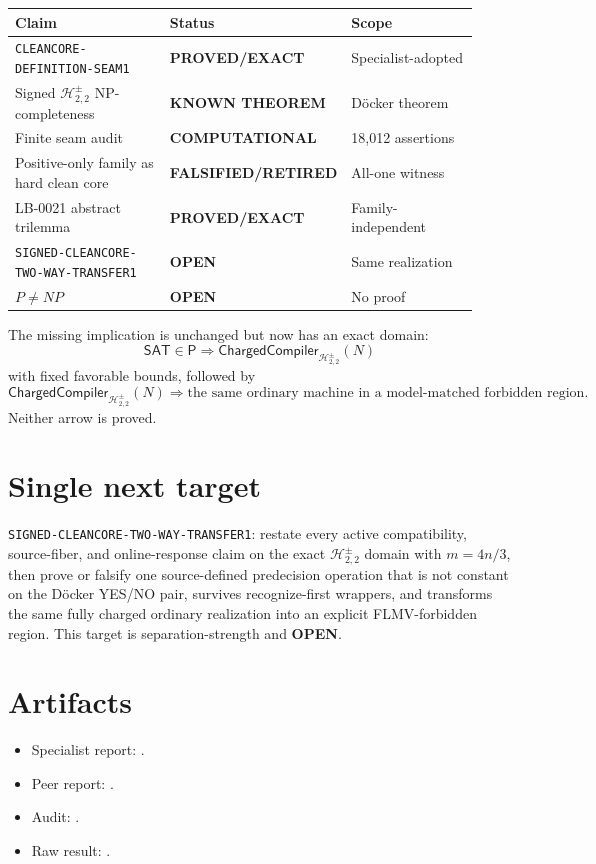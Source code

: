 \documentclass[11pt]{article}
\newcommand{\SAT}{\mathsf{SAT}}
\newcommand{\Hsigned}{\mathcal H^{\pm}_{2,2}}
\newcommand{\EXACT}{\textbf{PROVED/EXACT}}
\newcommand{\KNOWN}{\textbf{KNOWN THEOREM}}
\newcommand{\COMP}{\textbf{COMPUTATIONAL}}
\newcommand{\OPEN}{\textbf{OPEN}}
\newcommand{\RETIRED}{\textbf{FALSIFIED/RETIRED}}
\begin{document}
\begin{center}\scriptsize
\begin{tabular}{@{}p{0.39\linewidth}p{0.22\linewidth}p{0.31\linewidth}@{}}
\toprule
Claim & Status & Scope\\
\midrule
\texttt{CLEANCORE-DEFINITION-SEAM1} & \EXACT & Specialist-adopted\\
Signed $\Hsigned$ NP-completeness & \KNOWN & D\"ocker theorem\\
Finite seam audit & \COMP & 18,012 assertions\\
Positive-only family as hard clean core & \RETIRED & All-one witness\\
LB-0021 abstract trilemma & \EXACT & Family-independent\\
\texttt{SIGNED-CLEANCORE-TWO-WAY-TRANSFER1} & \OPEN & Same realization\\
$P\ne NP$ & \OPEN & No proof\\
\bottomrule
\end{tabular}
\end{center}

The missing implication is unchanged but now has an exact domain:
\[
 \SAT\in\mathsf P
 \Longrightarrow
 \mathsf{ChargedCompiler}_{\Hsigned}(N)
\]
with fixed favorable bounds, followed by
\[
 \mathsf{ChargedCompiler}_{\Hsigned}(N)
 \Longrightarrow
 \text{the same ordinary machine in a model-matched forbidden region}.
\]
Neither arrow is proved.

\section{Single next target}

\texttt{SIGNED-CLEANCORE-TWO-WAY-TRANSFER1}: restate every active
compatibility, source-fiber, and online-response claim on the exact
$\Hsigned$ domain with $m=4n/3$, then prove or falsify one source-defined
predecision operation that is not constant on the D\"ocker YES/NO pair,
survives recognize-first wrappers, and transforms the same fully charged
ordinary realization into an explicit FLMV-forbidden region.  This target
is separation-strength and \OPEN.

\section{Artifacts}
\begin{itemize}
\item Specialist report:
.
\item Peer report:
.
\item Audit:
.
\item Raw result:
.
\end{itemize}
\end{document}
